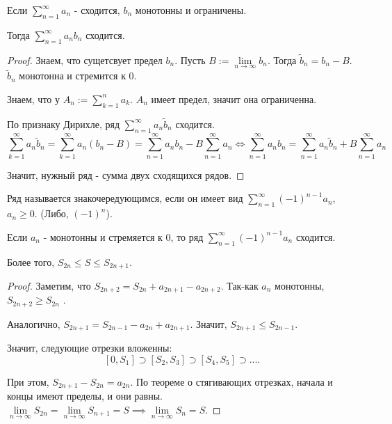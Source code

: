 \begin{theorem} \thmslashn

   Если $\sum\limits_{n=1}^{\infty} a_{n}$ - сходится, $b_{n}$ монотонны и ограничены.

   Тогда $\sum\limits_{n=1}^{\infty} a_{n}b_{n}$ сходится.

   \begin{proof} \thmslashn
   
      Знаем, что сущетсвует предел $b_{n}$. Пусть $B := \lim\limits_{n \to \infty} b_{n}$. Тогда $\tilde{b}_{n} = b_{n} - B$. $\tilde{b}_{n}$ монотонна и стремится к $0$.

      Знаем, что у $A_{n} := \sum\limits_{k=1}^{n} a_{k}$. $A_{n}$ имеет предел, значит она ограниченна.

      По признаку Дирихле, ряд $\sum\limits_{n=1}^{\infty} a_{n}\tilde{b}_{n}$ сходится.
      \begin{equation*}
          \sum\limits_{k=1}^{\infty} a_{n}\tilde{b}_{n} = \sum\limits_{k=1}^{\infty} a_{n}(b_{n}-B) = \sum\limits_{n=1}^{\infty} a_{n}b_{n} - B \sum\limits_{n=1}^{\infty} a_{n} \iff \sum\limits_{n=1}^{\infty} a_{n}b_{n} = \sum\limits_{n=1}^{\infty} a_{n}\tilde{b}_{n} + B \sum\limits_{n=1}^{\infty} a_{n}
      \end{equation*}

      Значит, нужный ряд - сумма двух сходящихся рядов.
   \end{proof}
\end{theorem}
\begin{definition} \thmslashn 

    Ряд называется знакочередующимся, если он имеет вид $\sum\limits_{n=1}^{\infty} (-1)^{n-1}a_{n}$, $a_{n} \ge 0$. (Либо, $(-1)^{n}$).
\end{definition}
\begin{theorem} \thmslashn

    Если $a_{n}$ - монотонны и стремяется к $0$, то ряд $\sum\limits_{n=1}^{\infty} (-1)^{n-1}a_{n}$ сходится.

    Более того, $S_{2n} \le S \le S_{2n+1}$.
    \begin{proof} \thmslashn
    
       Заметим, что $S_{2n+2} = S_{2n} + a_{2n+1} - a_{2n+2}$. Так-как $a_{n}$ монотонны, $S_{2n+2} \ge  S_{2n}$ .

       Аналогично, $S_{2n+1} = S_{2n-1} - a_{2n} + a_{2n+1}$. Значит, $S_{2n+1} \le S_{2n-1}$.

       Значит, следующие отрезки вложенны:
       \[ [0, S_1] \supset [S_2, S_3] \supset [S_{4}, S_{5}] \supset \ldots .\]

       При этом, $S_{2n+1} - S_{2n} = a_{2n}$. По теореме о стягивающих отрезках, начала и концы имеют пределы, и они равны. $\lim\limits_{n \to \infty} S_{2n} = \lim\limits_{n \to \infty} S_{n+1} = S \implies \lim\limits_{n \to \infty} S_{n} = S$.
    \end{proof}
\end{theorem}
